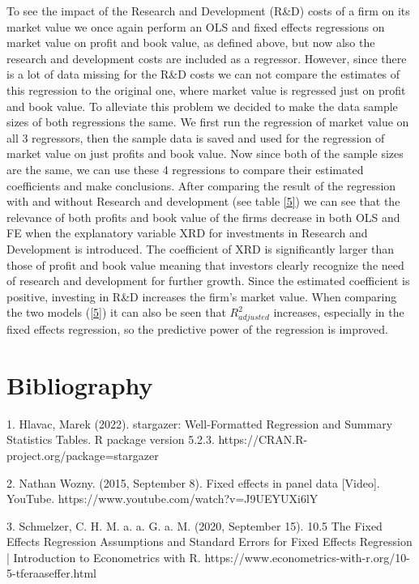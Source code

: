 \documentclass[11pt, letterpaper]{article}
\begin{document}
To see the impact of the Research and Development (R\&D)  costs of a firm on its market value we once again perform an OLS and fixed effects  regressions on market value on profit and book value, as defined above, but now also the research and development costs are included as a regressor. However, since there is a lot of data missing for the R\&D costs we can not compare the estimates of this regression to the original one, where market value is regressed just on profit and book value. To alleviate this problem we decided to make the data sample sizes of both regressions the same. We first run the regression of market value on all 3 regressors, then the sample data is saved and used for the regression of market value on just profits and book value. Now since both of the sample sizes are the same, we can use these 4 regressions to compare their estimated coefficients and make conclusions. After comparing the result of the regression with and without Research and development (see table \ref{5}) we can see that the relevance of both profits and book value of the firms decrease in both OLS and FE when the explanatory variable XRD for investments in Research and Development is introduced. The coefficient of XRD is significantly larger than those of profit and book value meaning that investors clearly recognize the need of research and development for further growth. Since the estimated coefficient is positive, investing in R\&D increases the firm's market value. When comparing the two models (\ref{5}) it can also be seen that $R_{adjusted}^2$ increases, especially in the fixed effects regression, so the predictive power of the regression is improved.
\newpage
\section{Bibliography}
1. Hlavac, Marek (2022). stargazer: Well-Formatted Regression and Summary Statistics Tables. R package version 5.2.3. https://CRAN.R-project.org/package=stargazer \newline

2. Nathan Wozny. (2015, September 8). Fixed effects in panel data [Video]. YouTube. \newline
https://www.youtube.com/watch?v=J9UEYUXi6lY \newline

3. Schmelzer, C. H. M. a. a. G. a. M. (2020, September 15). 10.5 The Fixed Effects Regression Assumptions and Standard Errors for Fixed Effects Regression | Introduction to Econometrics with R. https://www.econometrics-with-r.org/10-5-tferaaseffer.html \newline
\end{document}
